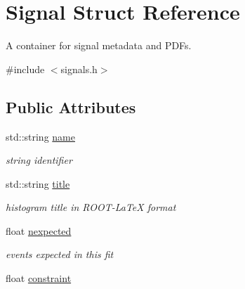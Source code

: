 \hypertarget{structSignal}{
\section{Signal Struct Reference}
\label{structSignal}
}


A container for signal metadata and PDFs.  




{\ttfamily \#include $<$signals.h$>$}

\subsection*{Public Attributes}
\begin{DoxyCompactItemize}
\item 
\hypertarget{structSignal_a9eb6a4c5b81ec1f39feb9c77d8e7affe}{
std::string \hyperlink{structSignal_a9eb6a4c5b81ec1f39feb9c77d8e7affe}{name}}
\label{structSignal_a9eb6a4c5b81ec1f39feb9c77d8e7affe}

\begin{DoxyCompactList}\small\item\em string identifier \item\end{DoxyCompactList}\item 
\hypertarget{structSignal_a48976cc492d686858876b2738176c7f4}{
std::string \hyperlink{structSignal_a48976cc492d686858876b2738176c7f4}{title}}
\label{structSignal_a48976cc492d686858876b2738176c7f4}

\begin{DoxyCompactList}\small\item\em histogram title in ROOT-\/LaTeX format \item\end{DoxyCompactList}\item 
\hypertarget{structSignal_ac84c07221d773bbaddb0a6531b09a32d}{
float \hyperlink{structSignal_ac84c07221d773bbaddb0a6531b09a32d}{nexpected}}
\label{structSignal_ac84c07221d773bbaddb0a6531b09a32d}

\begin{DoxyCompactList}\small\item\em events expected in this fit \item\end{DoxyCompactList}\item 
\hypertarget{structSignal_ae5cd6cd41dc5c0cdf634b2a3e4eea4a9}{
float \hyperlink{structSignal_ae5cd6cd41dc5c0cdf634b2a3e4eea4a9}{constraint}}
\label{structSignal_ae5cd6cd41dc5c0cdf634b2a3e4eea4a9}


\end{DoxyCompactItemize}
